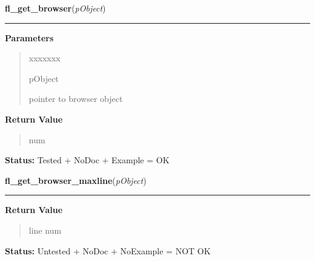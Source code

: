 \hspace{.8\funcindent}\begin{boxedminipage}{\funcwidth}

    \raggedright \textbf{fl\_get\_browser}(\textit{pObject})

    \vspace{-1.5ex}

    \rule{\textwidth}{0.5\fboxrule}
\setlength{\parskip}{2ex}
\setlength{\parskip}{1ex}
      \textbf{Parameters}
      \vspace{-1ex}

      \begin{quote}
        \begin{Ventry}{xxxxxxx}

          \item[pObject]

          pointer to browser object

        \end{Ventry}

      \end{quote}

      \textbf{Return Value}
    \vspace{-1ex}

      \begin{quote}
      num

      \end{quote}

\textbf{Status:} Tested + NoDoc + Example = OK



    \end{boxedminipage}

    \label{xformslib:library:fl_get_browser_maxline}

    \vspace{0.5ex}

\hspace{.8\funcindent}\begin{boxedminipage}{\funcwidth}

    \raggedright \textbf{fl\_get\_browser\_maxline}(\textit{pObject})

    \vspace{-1.5ex}

    \rule{\textwidth}{0.5\fboxrule}
\setlength{\parskip}{2ex}
\setlength{\parskip}{1ex}
      \textbf{Return Value}
    \vspace{-1ex}

      \begin{quote}
      line num

      \end{quote}

\textbf{Status:} Untested + NoDoc + NoExample = NOT OK



    \end{boxedminipage}

